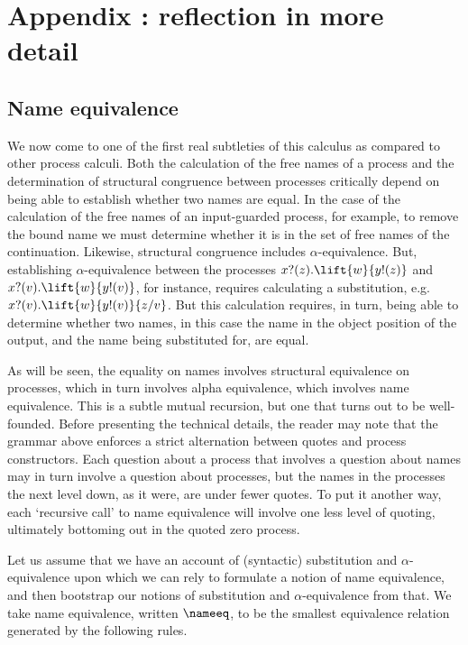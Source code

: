 \section{Appendix :  reflection in more detail}\label{appendix:rho_details}

\subsection{Name equivalence}

We now come to one of the first real subtleties of this calculus as
compared to other process calculi. Both the calculation of the free
names of a process and the determination of structural congruence
between processes critically depend on being able to establish whether
two names are equal. In the case of the calculation of the free names
of an input-guarded process, for example, to remove the bound name we
must determine whether it is in the set of free names of the
continuation. Likewise, structural congruence includes
$\alpha$-equivalence. But, establishing $\alpha$-equivalence between
the processes $x?(z).\lift{w}{y!(z)}$ and $x?(v).\lift{w}{y!(v)}$, for
instance, requires calculating a substitution,
e.g. $x?(v).\lift{w}{y!(v)}\{z / v \}$. But this calculation requires,
in turn, being able to determine whether two names, in this case the
name in the object position of the output, and the name being
substituted for, are equal.

As will be seen, the equality on names involves structural equivalence
on processes, which in turn involves alpha equivalence, which involves
name equivalence. This is a subtle mutual recursion, but one that
turns out to be well-founded. Before presenting the technical details,
the reader may note that the grammar above enforces a strict
alternation between quotes and process constructors. Each question
about a process that involves a question about names may in turn
involve a question about processes, but the names in the processes the
next level down, as it were, are under fewer quotes. To put it another
way, each `recursive call' to name equivalence will involve one less
level of quoting, ultimately bottoming out in the quoted zero process.

Let us assume that we have an account of (syntactic) substitution and
$\alpha$-equivalence upon which we can rely to formulate a notion of
name equivalence, and then bootstrap our notions of substitution and
$\alpha$-equivalence from that. We take name equivalence, written
$\nameeq$, to be the smallest equivalence relation generated by the
following rules.

